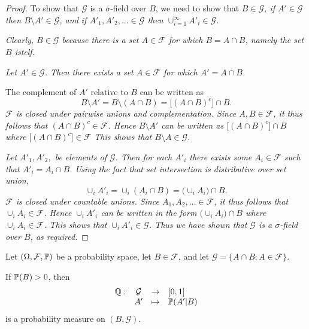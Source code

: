 \begin{proof}
To show that $\mathcal{G}$ is a $\sigma$-field over $B$, we need to show that
\ben
\it $B\in\mathcal{G}$, 
\it if $A'\in\mathcal{G}$ then $B\setminus A'\in\mathcal{G}$, and
\it if $A'_1,A'_2,\ldots\in\mathcal{G}$ then $\cup_{i=1}^{\infty} A'_i\in\mathcal{G}$.
\een

\ben 
\it %
Clearly, $B\in\mathcal{G}$ because there is a set $A\in\mathcal{F}$ for which $B = A\cap B$, namely the set $B$ istelf.

\it %
Let $A'\in\mathcal{G}$. Then there exists a set $A\in\mathcal{F}$ for which $A'=A\cap B$. 
\par
The complement of $A'$ relative to $B$ can be written as
\[
B\setminus A'	= B\setminus (A\cap B)	= \big[(A\cap B)^c\big] \cap B.
\]
\bit
\it 
$\mathcal{F}$ is closed under pairwise unions and complementation. 
\it 
Since $A,B\in\mathcal{F}$, it thus follows that $(A\cap B)^c \in\mathcal{F}$. 
\it
Hence $B\setminus A'$ can be written as $\big[(A\cap B)^c\big]\cap B$ where $\big[(A\cap B)^c\big]\in\mathcal{F}$
\it
This shows that $B\setminus A\in\mathcal{G}$.
\eit

\it %
Let $A'_1,A'_2,$ be elements of $\mathcal{G}$. Then for each $A'_i$ there exists some $A_i\in\mathcal{F}$ such that $A'_i=A_i\cap B$. Using the fact that set intersection is distributive over set union,
\[
\cup_i A'_i 
	= \cup_i(A_i\cap B) 
	= \big(\cup_i A_i\big) \cap B.
\]
\bit
\it $\mathcal{F}$ is closed under countable unions.
\it
Since $A_1,A_2,\ldots\in\mathcal{F}$, it thus follows that $\cup_i A_i \in\mathcal{F}$.
\it
Hence $\cup_i A'_i$ can be written in the form $\big(\cup_i A_i\big)\cap B$ where $\cup_i A_i\in\mathcal{F}$.
\it
This shows that $\cup_i A'_i\in\mathcal{G}$.
\eit
\een
Thus we have shown that $\mathcal{G}$ is a $\sigma$-field over $B$, as required.
\end{proof}

\begin{theorem}\label{thm:cond_prob_measure}
Let $(\Omega,\mathcal{F},\mathbb{P})$ be a probability space, let $B\in\mathcal{F}$, and let $\mathcal{G} = \{A\cap B: A\in\mathcal{F}\}$. 
\par
If $\mathbb{P}(B)>0$, then
\[
\begin{array}{rccl}
	\mathbb{Q}: 	& \mathcal{G} & \to & [0,1] \\
					& A'			& \mapsto	& \mathbb{P}(A'|B)
\end{array}
\]
is a probability measure on $(B,\mathcal{G})$.
\end{theorem}

